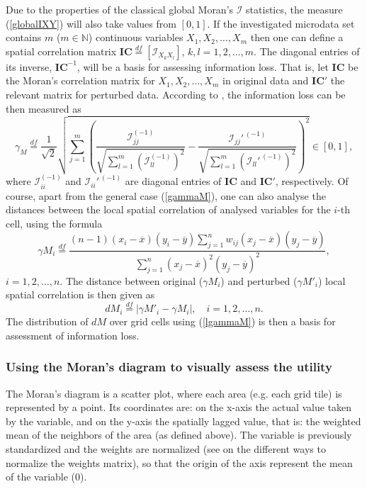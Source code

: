 Due to the properties of the classical global Moran's $\mathcal{I}$ statistics, the measure (\ref{globalIXY}) will also take values from $[0,1]$. If the investigated microdata set contains $m$ ($m\in\mathbb{N}$) continuous variables $X_1,X_2,\ldots,X_m$ then one can define a spatial correlation matrix $\mathbf{IC}\stackrel{df}{=}[\mathcal{I}_{X_kX_l}]$, $k,l=1,2,\ldots,m$. The diagonal entries of its inverse, $\mathbf{IC}^{-1}$, will be a basis for assessing information loss. That is, let $\mathbf{IC}$ be the Moran's correlation matrix for $X_1,X_2,\ldots,X_m$ in original data and $\mathbf{IC}'$ the relevant matrix for perturbed data. According to \cite{Mlodak2022}, the information loss can be then measured as
\begin{equation}
 \gamma_M\stackrel{df}{=}\frac{1}{\sqrt{2}}\sqrt{\sum_{j=1}^{m}{\left(\frac{\mathcal{I}_{jj}^{(-1)}}{\sqrt{\sum_{l=1}^m{\left(\mathcal{I}_{ll}^{(-1)}\right)^2}}}-\frac{\mathcal{I}_{jj}'^{\,(-1)}}{\sqrt{\sum_{l=1}^m{\left(\mathcal{I}_{ll}'^{\,(-1)}\right)^2}}}\right)^2}}\in [0,1],
\label{gammaM}
\end{equation}
where $\mathcal{I}_{ii}^{(-1)}$ and $\mathcal{I}_{ii}'^{\,(-1)}$ are diagonal entries of $\mathbf{IC}$ and $\mathbf{IC}'$, respectively. Of course, apart from the general case (\ref{gammaM}), one can also analyse the distances between the local spatial correlation of analysed variables for the $i$-th cell, using the formula
\begin{equation}
 {\gamma}M_i\stackrel{df}{=}\frac{(n-1)(x_i-\overline{x})(y_i-\overline{y})\sum_{j=1}^n{w_{ij}(x_j-\overline{x})(y_j-\overline{y})}}{\sum_{j=1}^n{(x_j-\overline{x})^2(y_j-\overline{y})^2}},
\label{lgammaM}
\end{equation}
$i=1,2,\ldots,n$. The distance between original (${\gamma}M_i$) and perturbed (${\gamma}M'_i$) local spatial correlation is then given as
\begin{equation}
dM_i\stackrel{df}{=}\left|{\gamma}M'_i-{\gamma}M_i\right|,\quad i=1,2,\ldots,n.
\label{eq:dM_i}
\end{equation}
The distribution of $dM$ over grid cells using (\ref{lgammaM}) is then a basis for assessment of information loss.  


\subsubsection{Using the Moran's diagram to visually assess the utility}

The Moran's diagram is a scatter plot, where each area (e.g. each grid tile) is represented by a point. Its coordinates are: on the x-axis the actual value taken by the variable, and on the y-axis the spatially lagged value, that is: the weighted mean of the neighbors of the area (as defined above). The variable is previously standardized and the weights are normalized (see \cite{BellefonEtAlt_2018} on the different ways to normalize the weights matrix), so that the origin of the axis represent the mean of the variable (0). 

